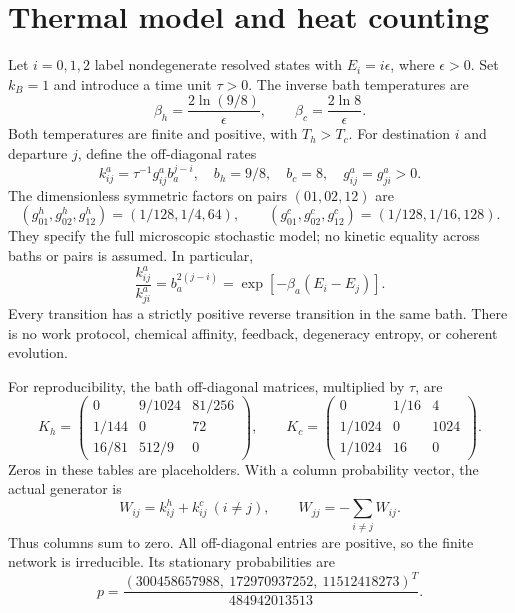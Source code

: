 \documentclass[aps,pre,10pt,onecolumn,notitlepage,longbibliography,amsmath,amssymb]{revtex4-2}
\begin{document}
\section{Thermal model and heat counting}
Let $i=0,1,2$ label nondegenerate resolved states with $E_i=i\epsilon$, where $\epsilon>0$. Set $k_B=1$ and introduce a time unit $\tau>0$. The inverse bath temperatures are
\begin{equation}
 \beta_h=\frac{2\ln(9/8)}{\epsilon},\qquad
 \beta_c=\frac{2\ln8}{\epsilon}.
\end{equation}
Both temperatures are finite and positive, with $T_h>T_c$. For destination $i$ and departure $j$, define the off-diagonal rates
\begin{equation}\label{eq:rates}
 k^a_{ij}=\tau^{-1}g^a_{ij}b_a^{j-i},\quad
 b_h=9/8,\quad b_c=8,\quad g^a_{ij}=g^a_{ji}>0.
\end{equation}
The dimensionless symmetric factors on pairs $(01,02,12)$ are
\begin{equation}
 (g^h_{01},g^h_{02},g^h_{12})=(1/128,1/4,64),\qquad
 (g^c_{01},g^c_{02},g^c_{12})=(1/128,1/16,128).
\end{equation}
They specify the full microscopic stochastic model; no kinetic equality across baths or pairs is assumed. In particular,
\begin{equation}
 \frac{k^a_{ij}}{k^a_{ji}}=b_a^{2(j-i)}
 =\exp[-\beta_a(E_i-E_j)].
\end{equation}
Every transition has a strictly positive reverse transition in the same bath. There is no work protocol, chemical affinity, feedback, degeneracy entropy, or coherent evolution.

For reproducibility, the bath off-diagonal matrices, multiplied by $\tau$, are
\begin{equation}\label{eq:matrices}
 K_h=\begin{pmatrix}
 0&9/1024&81/256\\
 1/144&0&72\\
 16/81&512/9&0
 \end{pmatrix},\qquad
 K_c=\begin{pmatrix}
 0&1/16&4\\
 1/1024&0&1024\\
 1/1024&16&0
 \end{pmatrix}.
\end{equation}
Zeros in these tables are placeholders. With a column probability vector, the actual generator is
\begin{equation}
 W_{ij}=k^h_{ij}+k^c_{ij}\ (i\ne j),\qquad
 W_{jj}=-\sum_{i\ne j}W_{ij}.
\end{equation}
Thus columns sum to zero. All off-diagonal entries are positive, so the finite network is irreducible. Its stationary probabilities are
\begin{equation}
 p=\frac{(300458657988,\ 172970937252,\ 11512418273)^T}{484942013513}.
\end{equation}
\end{document}
